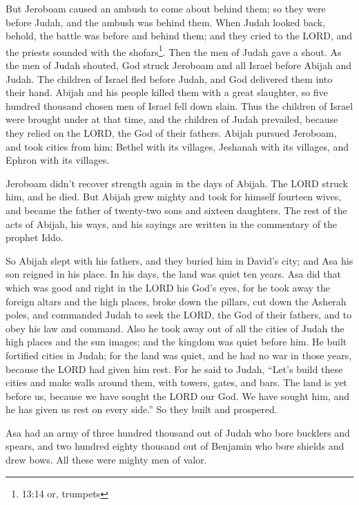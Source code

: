 \myverse{}But Jeroboam caused an ambush to come about behind them; so
they were before Judah, and the ambush was behind them.
\myverse{}When Judah looked back, behold, the battle was before and behind them; and
they cried to the LORD, and the priests sounded with the shofars\footnote{13:14 or, trumpets}.
\myverse{}Then the men of Judah gave a shout. As the men of Judah shouted, God struck
Jeroboam and all Israel before Abijah and Judah.
\myverse{}The children of Israel fled before Judah, and God delivered them into their
hand.
\myverse{}Abijah and his people killed them with a great slaughter, so five hundred
thousand chosen men of Israel fell down slain.
\myverse{}Thus the children of Israel were brought under at that time, and the children
of Judah prevailed, because they relied on the LORD, the God of their fathers.
\myverse{}Abijah pursued Jeroboam, and took cities from him: Bethel with its villages,
Jeshanah with its villages, and Ephron with its villages.

\myverse{}Jeroboam didn’t recover strength again in the days of Abijah.
The LORD struck him, and he died.
\myverse{}But Abijah grew mighty and took for himself fourteen wives, and became the
father of twenty-two sons and sixteen daughters.
\myverse{}The rest of the acts of Abijah, his ways, and his sayings are written in
the commentary of the prophet Iddo.


\mychapter{} \myverse*{}So Abijah slept with his fathers, and they buried him in David’s
city; and Asa his son reigned in his place. In his days, the land was quiet ten years.
\myverse{}Asa did that which was good and right in the LORD his God’s eyes,
\myverse{}for he took away the foreign altars and the high places, broke down the pillars,
cut down the Asherah poles,
\myverse{}and commanded Judah to seek the LORD, the God of their fathers, and to obey
his law and command.
\myverse{}Also he took away out of all the cities of Judah the high places and the sun
images; and the kingdom was quiet before him.
\myverse{}He built fortified cities in Judah; for the land was quiet, and he had no war
in those years, because the LORD had given him rest.
\myverse{}For he said to Judah, “Let’s build these cities and make walls around them,
with towers, gates, and bars. The land is yet before us, because we have sought the LORD our God. We have
sought him, and he has given us rest on every side.” So they built and prospered.

\myverse{}Asa had an army of three hundred thousand out of Judah who bore
bucklers and spears, and two hundred eighty thousand out of Benjamin who bore shields and drew bows. All
these were mighty men of valor.

